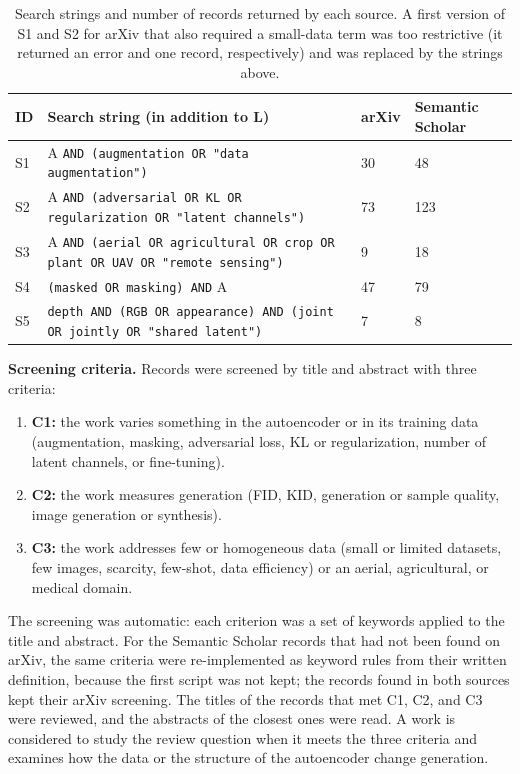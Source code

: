 \begin{table}[H]
\centering
\small
\begin{tabular}{p{}p{}p{}p{}}
\hline
\textbf{ID} & \textbf{Search string (in addition to L)} & \textbf{arXiv} & \textbf{Semantic Scholar} \\
\hline
S1 & A \texttt{AND (augmentation OR "data augmentation")} & 30 & 48 \\
S2 & A \texttt{AND (adversarial OR KL OR regularization OR "latent channels")} & 73 & 123 \\
S3 & A \texttt{AND (aerial OR agricultural OR crop OR plant OR UAV OR "remote sensing")} & 9 & 18 \\
S4 & \texttt{(masked OR masking) AND} A & 47 & 79 \\
S5 & \texttt{depth AND (RGB OR appearance) AND (joint OR jointly OR "shared latent")} & 7 & 8 \\
\hline
\end{tabular}
\caption{Search strings and number of records returned by each source. A first version of S1 and S2 for arXiv that also required a small-data term was too restrictive (it returned an error and one record, respectively) and was replaced by the strings above.}
\end{table}

\textbf{Screening criteria.} Records were screened by title and abstract with three criteria:
\begin{enumerate}
  \item \textbf{C1:} the work varies something in the autoencoder or in its training data (augmentation, masking, adversarial loss, KL or regularization, number of latent channels, or fine-tuning).
  \item \textbf{C2:} the work measures generation (FID, KID, generation or sample quality, image generation or synthesis).
  \item \textbf{C3:} the work addresses few or homogeneous data (small or limited datasets, few images, scarcity, few-shot, data efficiency) or an aerial, agricultural, or medical domain.
\end{enumerate}
The screening was automatic: each criterion was a set of keywords applied to the title and abstract. For the Semantic Scholar records that had not been found on arXiv, the same criteria were re-implemented as keyword rules from their written definition, because the first script was not kept; the records found in both sources kept their arXiv screening. The titles of the records that met C1, C2, and C3 were reviewed, and the abstracts of the closest ones were read. A work is considered to study the review question when it meets the three criteria and examines how the data or the structure of the autoencoder change generation.

